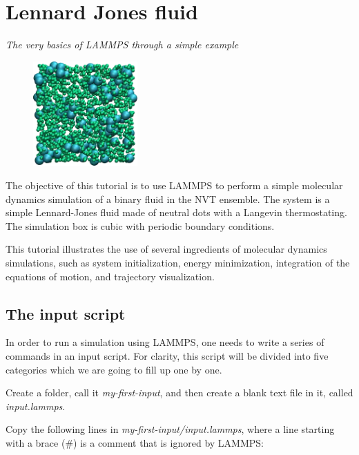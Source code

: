 \chapter{Lennard Jones fluid}

\vspace{-1cm} \noindent \textcolor{graytitle}{\textit{{\Large The very basics of LAMMPS through a simple example}}\vspace{0.5cm} }

\noindent \hspace{-0.45cm}\begin{figure}
\includegraphics[width=4cm]{tutorials/level0/lennard-jones-fluid/binary_LJ_fluid_light.png}
\end{figure}

\noindent The objective of this tutorial is to use
LAMMPS to perform a simple molecular dynamics simulation
of a binary fluid in the NVT ensemble. The system is a simple Lennard-Jones fluid
made of neutral dots with a Langevin thermostating. The
simulation box is cubic with periodic boundary conditions.

This tutorial illustrates the use of several ingredients of
molecular dynamics simulations, such as system initialization,
energy minimization, integration of the equations of motion,
and trajectory visualization.

\section{The input script}

\noindent In order to run a simulation using LAMMPS, one needs to
write a series of commands in an input script. For clarity,
this script will be divided into five categories which we are going to
fill up one by one. 

Create a folder, call it \textit{my-first-input}, and then create a blank
text file in it, called \textit{input.lammps}.

Copy the following lines in \textit{my-first-input/input.lammps}, 
where a line starting with a brace ($\#$) is a comment
that is ignored by LAMMPS:

